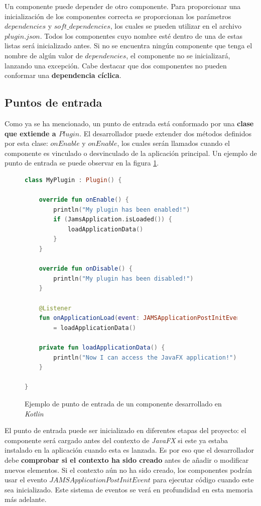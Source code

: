 Un componente puede depender de otro componente.
Para proporcionar una inicialización de los componentes
correcta se proporcionan los parámetros $dependencies$
y $soft\_dependencies$, los cuales se pueden utilizar en
el archivo $plugin.json$.
Todos los componentes cuyo nombre esté dentro de una de estas
listas será inicializado antes.
Si no se encuentra ningún componente que tenga el nombre
de algún valor de $dependencies$, el componente no
se inicializará, lanzando una excepción.
Cabe destacar que dos componentes no pueden conformar
una \textbf{dependencia cíclica}.

\subsection{Puntos de entrada}\label{subsec:puntos-de-entrada}

Como ya se ha mencionado, un punto de entrada está conformado
por una \textbf{clase que extiende a $Plugin$}.
El desarrollador puede extender dos métodos definidos por esta clase:
$onEnable$ y $onEnable$, los cuales serán llamados cuando el
componente es vinculado o desvinculado de la aplicación principal.
Un ejemplo de punto de entrada se puede observar en la figura \ref{fig:entry-point}.

\begin{figure}[h]
    \centering
    \begin{lstlisting}[frame=single,label={lst:entry-point},language=Kotlin]
class MyPlugin : Plugin() {

    override fun onEnable() {
        println("My plugin has been enabled!")
        if (JamsApplication.isLoaded()) {
            loadApplicationData()
        }
    }

    override fun onDisable() {
        println("My plugin has been disabled!")
    }

    @Listener
    fun onApplicationLoad(event: JAMSApplicationPostInitEvent)
        = loadApplicationData()

    private fun loadApplicationData() {
        println("Now I can access the JavaFX application!")
    }

}
    \end{lstlisting}
    \caption{Ejemplo de punto de entrada de un componente desarrollado en \textit{Kotlin}}
    \label{fig:entry-point}
\end{figure}

 El punto de entrada puede ser inicializado en diferentes
etapas del proyecto: el componente será cargado antes del contexto
de \textit{JavaFX} si este ya estaba instalado en la aplicación
cuando esta es lanzada.
Es por eso que el desarrollador debe \textbf{comprobar si el contexto ha sido creado}
antes de añadir o modificar nuevos elementos.
Si el contexto aún no ha sido creado, los componentes podrán
usar el evento $JAMSApplicationPostInitEvent$ para ejecutar
código cuando este sea inicializado.
Este sistema de eventos se verá en profundidad en esta memoria más adelante.


